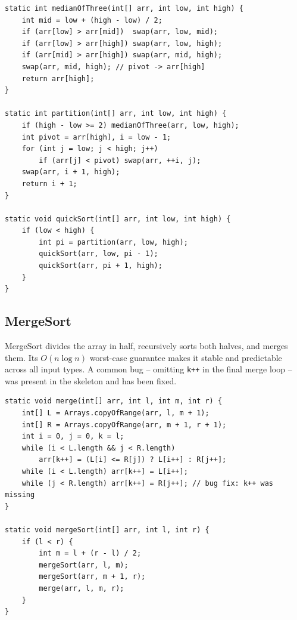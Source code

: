 \documentclass[12pt]{article}
\begin{document}
\begin{lstlisting}[caption={QuickSort -- median-of-three pivot and partition}, label={lst:qs}]
static int medianOfThree(int[] arr, int low, int high) {
    int mid = low + (high - low) / 2;
    if (arr[low] > arr[mid])  swap(arr, low, mid);
    if (arr[low] > arr[high]) swap(arr, low, high);
    if (arr[mid] > arr[high]) swap(arr, mid, high);
    swap(arr, mid, high); // pivot -> arr[high]
    return arr[high];
}

static int partition(int[] arr, int low, int high) {
    if (high - low >= 2) medianOfThree(arr, low, high);
    int pivot = arr[high], i = low - 1;
    for (int j = low; j < high; j++)
        if (arr[j] < pivot) swap(arr, ++i, j);
    swap(arr, i + 1, high);
    return i + 1;
}

static void quickSort(int[] arr, int low, int high) {
    if (low < high) {
        int pi = partition(arr, low, high);
        quickSort(arr, low, pi - 1);
        quickSort(arr, pi + 1, high);
    }
}
\end{lstlisting}

\subsection*{MergeSort}

\hspace{0.8cm} MergeSort divides the array in half, recursively sorts both halves, and merges them.
Its $O(n \log n)$ worst-case guarantee makes it stable and predictable across all input types.
A common bug -- omitting \texttt{k++} in the final merge loop -- was present in the skeleton
and has been fixed.

\begin{lstlisting}[caption={MergeSort -- merge step}, label={lst:ms}]
static void merge(int[] arr, int l, int m, int r) {
    int[] L = Arrays.copyOfRange(arr, l, m + 1);
    int[] R = Arrays.copyOfRange(arr, m + 1, r + 1);
    int i = 0, j = 0, k = l;
    while (i < L.length && j < R.length)
        arr[k++] = (L[i] <= R[j]) ? L[i++] : R[j++];
    while (i < L.length) arr[k++] = L[i++];
    while (j < R.length) arr[k++] = R[j++]; // bug fix: k++ was missing
}

static void mergeSort(int[] arr, int l, int r) {
    if (l < r) {
        int m = l + (r - l) / 2;
        mergeSort(arr, l, m);
        mergeSort(arr, m + 1, r);
        merge(arr, l, m, r);
    }
}
\end{lstlisting}
\end{document}
